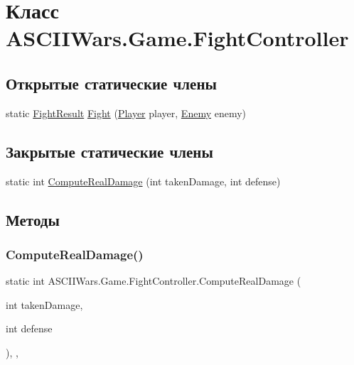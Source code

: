 \hypertarget{class_a_s_c_i_i_wars_1_1_game_1_1_fight_controller}{}\section{Класс A\+S\+C\+I\+I\+Wars.\+Game.\+Fight\+Controller}
\label{class_a_s_c_i_i_wars_1_1_game_1_1_fight_controller}
\subsection*{Открытые статические члены}
\begin{DoxyCompactItemize}
\item 
static \hyperlink{namespace_a_s_c_i_i_wars_1_1_game_a26bea755310826ad76e09cc1ce0c5ecd}{Fight\+Result} \hyperlink{class_a_s_c_i_i_wars_1_1_game_1_1_fight_controller_a9c168181e851d6ee67ac6d27ca73089a}{Fight} (\hyperlink{class_a_s_c_i_i_wars_1_1_game_1_1_player}{Player} player, \hyperlink{class_a_s_c_i_i_wars_1_1_game_1_1_enemy}{Enemy} enemy)
\end{DoxyCompactItemize}
\subsection*{Закрытые статические члены}
\begin{DoxyCompactItemize}
\item 
static int \hyperlink{class_a_s_c_i_i_wars_1_1_game_1_1_fight_controller_a532f2accd6035cdc8d13a1055d39399a}{Compute\+Real\+Damage} (int taken\+Damage, int defense)
\end{DoxyCompactItemize}


\subsection{Методы}
\hypertarget{class_a_s_c_i_i_wars_1_1_game_1_1_fight_controller_a532f2accd6035cdc8d13a1055d39399a}{}\label{class_a_s_c_i_i_wars_1_1_game_1_1_fight_controller_a532f2accd6035cdc8d13a1055d39399a} 
\subsubsection{\texorpdfstring{Compute\+Real\+Damage()}{ComputeRealDamage()}}
{\footnotesize\ttfamily static int A\+S\+C\+I\+I\+Wars.\+Game.\+Fight\+Controller.\+Compute\+Real\+Damage (\begin{DoxyParamCaption}\item[{int}]{taken\+Damage,  }\item[{int}]{defense }\end{DoxyParamCaption})\hspace{0.3cm}{\ttfamily [inline]}, {\ttfamily [static]}, {\ttfamily [private]}}

